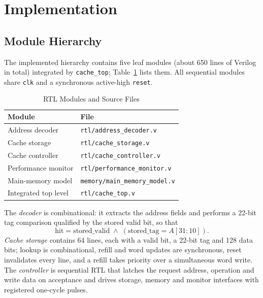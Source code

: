 \documentclass[conference,a4paper]{IEEEtran}
\begin{document}
\section{Implementation}\label{sec:impl}
\subsection{Module Hierarchy}\label{sec:mods}
The implemented hierarchy contains five leaf modules (about 650 lines of Verilog in total) integrated by \texttt{cache\_top}; Table~\ref{tab:mods} lists them. All sequential modules share \texttt{clk} and a synchronous active-high \texttt{reset}.

\begin{table}[!t]
\caption{RTL Modules and Source Files}\label{tab:mods}
\centering
\renewcommand{\arraystretch}{1.1}
\begin{tabular}{@{}lp{4.1cm}@{}}
\toprule
\textbf{Module} & \textbf{File}\\
\midrule
Address decoder & \texttt{rtl/address\_decoder.v}\\
Cache storage & \texttt{rtl/cache\_storage.v}\\
Cache controller & \texttt{rtl/cache\_controller.v}\\
Performance monitor & \texttt{rtl/performance\_monitor.v}\\
Main-memory model & \texttt{memory/main\_memory\_model.v}\\
Integrated top level & \texttt{rtl/cache\_top.v}\\
\bottomrule
\end{tabular}
\end{table}

The \emph{decoder} is combinational: it extracts the address fields and performs a 22-bit tag comparison qualified by the stored valid bit, so that
\begin{equation}
\mathrm{hit} = \mathrm{stored\_valid}\;\wedge\;(\mathrm{stored\_tag}=A[31{:}10]).
\label{eq:hit}
\end{equation}
\emph{Cache storage} contains 64 lines, each with a valid bit, a 22-bit tag and 128 data bits; lookup is combinational, refill and word updates are synchronous, reset invalidates every line, and a refill takes priority over a simultaneous word write. The \emph{controller} is sequential RTL that latches the request address, operation and write data on acceptance and drives storage, memory and monitor interfaces with registered one-cycle pulses.
\end{document}
